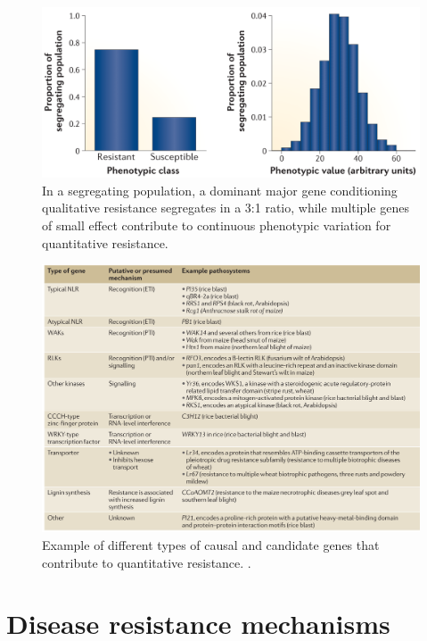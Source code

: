 \documentclass[11pt,dvipsnames,ignorenonframetext,aspectratio=169]{beamer}
\begin{document}
\begin{frame}{}
\protect\hypertarget{section-17}{}
\begin{figure}
\includegraphics[width=0.99\linewidth]{../images/qualitative_quantitative_segregation} \caption{In a segregating population, a dominant major gene conditioning qualitative resistance segregates in a 3:1 ratio, while multiple genes of small effect contribute to continuous phenotypic variation for quantitative resistance.}\label{fig:quantitative-qualitative-segregation}
\end{figure}
\end{frame}

\begin{frame}{}
\protect\hypertarget{section-18}{}
\begin{figure}
\includegraphics[width=0.7\linewidth]{../images/quantitative_candidate} \caption{Example of different types of causal and candidate genes that contribute to quantitative resistance. \cite{nelson2018navigating}.}\label{fig:quantitative-candidate-genes}
\end{figure}
\end{frame}

\hypertarget{disease-resistance-mechanisms}{%
\section{Disease resistance
mechanisms}\label{disease-resistance-mechanisms}}
\end{document}
